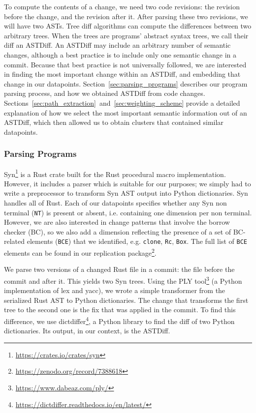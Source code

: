 To compute the contents of a change, we need two code revisions: the revision before the change, and the revision after it. After parsing these two revisions, we will have two ASTs. Tree diff algorithms can compute the differences between two arbitrary trees. When the trees are programs' abstract syntax trees, we call their diff an ASTDiff. An ASTDiff may include an arbitrary number of semantic changes, although a best practice is to include only one semantic change in a commit. Because that best practice is not universally followed, we are interested in finding the most important change within an ASTDiff, and embedding that change in our datapoints. Section~\ref{sec:parsing_programs} describes our program parsing process, and how we obtained ASTDiff from code changes. Sections~\ref{sec:path_extraction}~and~\ref{sec:weighting_scheme} provide a detailed explanation of how we select the most important semantic information out of an ASTDiff, which then allowed us to obtain clusters that contained similar datapoints. 

\subsubsection{\label{sec:parsing_programs}Parsing Programs}

Syn\footnote{\url{https://crates.io/crates/syn}} is a Rust crate built for the Rust procedural macro implementation. However, it includes a parser which is suitable for our purposes; we simply had to write a preprocessor to transform Syn AST output into Python dictionaries. Syn handles all of Rust. Each of our datapoints specifies whether any Syn non terminal (\texttt{NT}) is present or absent, i.e. containing one dimension per non terminal. However, we are also interested in change patterns that involve the borrow checker (BC), so we also add a dimension reflecting the presence of a set of BC-related elements (\texttt{BCE}) that we identified, e.g. \texttt{clone}, \texttt{Rc}, \texttt{Box}. The full list of \texttt{BCE} elements can be found in our replication package\footnote{\url{https://zenodo.org/record/7388618}}.

We parse two versions of a changed Rust file in a commit: the file before the commit and after it. This yields two Syn trees. Using the PLY tool\footnote{\url{https://www.dabeaz.com/ply/}} (a Python implementation of lex and yacc), we wrote a simple transformer from the serialized Rust AST to Python dictionaries. The change that transforms the first tree to the second one is the fix that was applied in the commit. To find this difference, we use dictdiffer\footnote{\url{https://dictdiffer.readthedocs.io/en/latest/}}, a Python library to find the diff of two Python dictionaries. Its output, in our context, is the ASTDiff.

